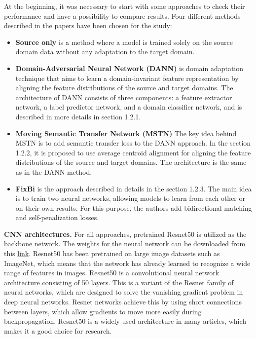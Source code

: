 At the beginning, it was necessary to start with some approaches to check their performance and have a possibility to compare results. Four different methods described in the papers have been chosen for the study:

\begin{itemize}
    \item \textbf{Source only} is a method where a model is trained solely on the source domain data without any adaptation to the target domain.
    \item \textbf{Domain-Adversarial Neural Network (DANN)} is domain adaptation technique that aims to learn a domain-invariant feature representation by aligning the feature distributions of the source and target domains. The architecture of DANN consists of three components: a feature extractor network, a label predictor network, and a domain classifier network, and is described in more details in section 1.2.1.
    \item \textbf{Moving Semantic Transfer Network (MSTN)} The key idea behind MSTN is to add semantic transfer loss to the DANN approach. In the section 1.2.2, it is proposed to use average centroid alignment for aligning the feature distributions of the source and target domains. The architecture is the same as in the DANN method. 
    \item  \textbf{FixBi} is the approach described in details in the section 1.2.3. The main idea is to train two neural networks, allowing models to learn from each other or on their own results. For this purpose, the authors add bidirectional matching and self-penalization losses.
\end{itemize}

\textbf{CNN architectures.} For all approaches, pretrained Resnet50 \cite{he2016deep} is utilized as the backbone network. The weights for the neural network can be downloaded from this \href{https://download.pytorch.org/models/resnet50-19c8e357.pth}{link}. Resnet50 has been pretrained on large image datasets such as ImageNet, which means that the network has already learned to recognize a wide range of features in images. Resnet50 is a convolutional neural network architecture consisting of 50 layers. This is a variant of the Resnet family of neural networks, which are designed to solve the vanishing gradient problem in deep neural networks. Resnet networks achieve this by using short connections between layers, which allow gradients to move more easily during backpropagation. Resnet50 is a widely used architecture in many articles, which makes it a good choice for research.\\ 

